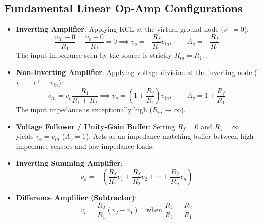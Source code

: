 \subsection{Fundamental Linear Op-Amp Configurations}
\begin{itemize}[leftmargin=1.5em]
    \item \textbf{Inverting Amplifier}:
    Applying KCL at the virtual ground node ($v^- = 0$):
    \begin{equation}
    \frac{v_{in} - 0}{R_1} + \frac{v_o - 0}{R_f} = 0 \implies v_o = -\frac{R_f}{R_1} v_{in}, \qquad A_v = -\frac{R_f}{R_1}
    \end{equation}
    The input impedance seen by the source is strictly $R_{in} = R_1$.
    \item \textbf{Non-Inverting Amplifier}:
    Applying voltage division at the inverting node ($v^- = v^+ = v_{in}$):
    \begin{equation}
    v_{in} = v_o \frac{R_1}{R_1 + R_f} \implies v_o = \left( 1 + \frac{R_f}{R_1} \right) v_{in}, \qquad A_v = 1 + \frac{R_f}{R_1}
    \end{equation}
    The input impedance is exceptionally high ($R_{in} \to \infty$).
    \item \textbf{Voltage Follower / Unity-Gain Buffer}:
    Setting $R_f = 0$ and $R_1 = \infty$ yields $v_o = v_{in}$ ($A_v = 1$). Acts as an impedance matching buffer between high-impedance sensors and low-impedance loads.
    \item \textbf{Inverting Summing Amplifier}:
    \begin{equation}
    v_o = -\left( \frac{R_f}{R_1} v_1 + \frac{R_f}{R_2} v_2 + \cdots + \frac{R_f}{R_n} v_n \right)
    \end{equation}
    \item \textbf{Difference Amplifier (Subtractor)}:
    \begin{equation}
    v_o = \frac{R_2}{R_1}(v_2 - v_1) \quad \text{when } \frac{R_4}{R_3} = \frac{R_2}{R_1}
    \end{equation}
\end{itemize}

